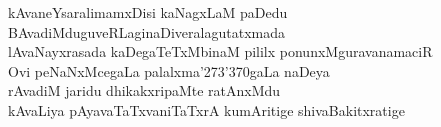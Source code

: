 \begin{entry}
\gl{}
\begin{shl}
kAvaneYsaralimamxDisi kaNagxLaM paDedu\\
BAvadiMduguveRLaginaDiveralagutatxmada\\
lAvaNayxrasada kaDegaTeTxMbinaM pililx ponunxMguravanamaciR\\
Ovi peNaNxMcegaLa palalxma\char'273\char'370gaLa naDeya\\
rAvadiM jaridu dhikakxripaMte ratAnxMdu\\
kAvaLiya pAyavaTaTxvaniTaTxrA kumAritige shivaBakitxratige 
\end{shl}
\end{entry}

\begin{entry}
\gl{}
\end{entry}

\begin{entry}
\end{entry}

\begin{entry}
\gl{}
\end{entry}

